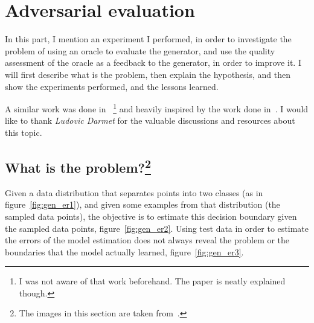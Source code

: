 \chapter{Adversarial evaluation}\label{ch:adv_eval}

\par In this part, I mention an experiment I performed, in order to investigate the problem of using an oracle to evaluate the generator, and use the quality assessment of the oracle as a feedback to the generator, in order to improve it. I will first describe what is the problem, then explain the hypothesis, and then show the experiments performed, and the lessons learned.

\par A similar work was done in~\citep{nguyen2015deep} \footnote{I was not aware of that work beforehand. The paper is neatly explained though.} and heavily inspired by the work done in~\citep{adv_attack_presentation}. I would like to thank \textit{Ludovic Darmet} for the valuable discussions and resources about this topic.

\section{What is the problem?\footnote{The images in this section are taken from~\citep{adv_attack_presentation}.}}
  \par Given a data distribution that separates points into two classes (as in figure~\ref{fig:gen_er1}), and given some examples from that distribution (the sampled data points), the objective is to estimate this decision boundary given the sampled data points, figure~\ref{fig:gen_er2}. Using test data in order to estimate the errors of the model estimation does not always reveal the problem or the boundaries that the model actually learned, figure~\ref{fig:gen_er3}.

